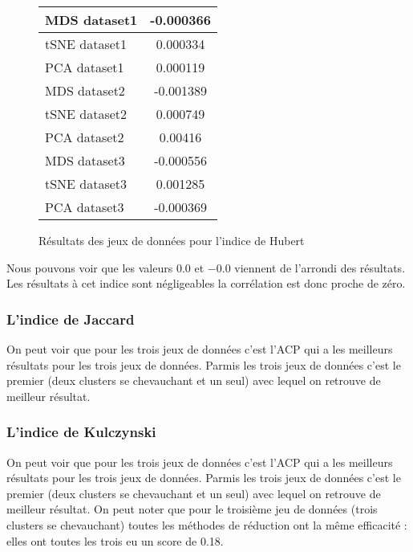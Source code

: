 \begin{center}
    \begin{figure}[!ht]  
        \begin{tabular}{ | l | c | }
            \hline			
            MDS dataset1 & -0.000366 \\ \hline
            tSNE dataset1 & 0.000334 \\ \hline
            PCA dataset1 & 0.000119  \\ \hline
            MDS dataset2 & -0.001389 \\  \hline
            tSNE dataset2 & 0.000749 \\ \hline
            PCA dataset2 & 0.00416  \\ \hline
            MDS dataset3 & -0.000556 \\ \hline
            tSNE dataset3 & 0.001285 \\ \hline
            PCA dataset3 & -0.000369  \\ 
            \hline  
        \end{tabular}
    \caption{Résultats des jeux de données pour l'indice de Hubert}
    \end{figure}
\end{center}
\smallskip

Nous pouvons voir que les valeurs $0.0$ et $-0.0$ viennent de l'arrondi des résultats. Les résultats à cet indice sont négligeables la corrélation est donc proche de zéro.


\subsubsection{L'indice de Jaccard}
On peut voir que pour les trois jeux de données c'est l'ACP qui a les meilleurs résultats pour les trois jeux de données.
Parmis les trois jeux de données c'est le premier (deux clusters se chevauchant et un seul) avec lequel on retrouve de meilleur résultat.

\subsubsection{L'indice de Kulczynski}
On peut voir que pour les trois jeux de données c'est l'ACP qui a les meilleurs résultats pour les trois jeux de données.
Parmis les trois jeux de données c'est le premier (deux clusters se chevauchant et un seul) avec lequel on retrouve de meilleur résultat.
On peut noter que pour le troisième jeu de données (trois clusters se chevauchant) toutes les méthodes de réduction ont la même efficacité : 
elles ont toutes les trois eu un score de 0.18.


